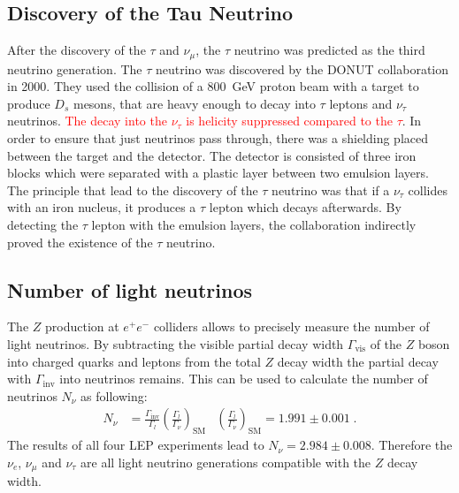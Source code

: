 \subsection{Discovery of the Tau Neutrino}
After the discovery of the $\tau$ and $\nu_{\mu}$, the $\tau$ neutrino was predicted as the third neutrino generation. The $\tau$ neutrino was discovered by the DONUT collaboration in 2000. They used the collision of a \SI{800}{\giga\electronvolt} proton beam with a target to produce $D_s$ mesons, that are heavy enough to decay into $\tau$ leptons and $\nu_{\tau}$ neutrinos. \textcolor{red}{The decay into the $\nu_{\tau}$ is helicity suppressed compared to the $\tau$}. In order to ensure that just neutrinos pass through, there was a shielding placed between the target and the detector.
The detector is consisted of three iron blocks which were separated with a plastic layer between two emulsion layers. The principle that lead to the discovery of the $\tau$ neutrino was that if a $\nu_{\tau}$ collides with an iron nucleus, it produces a $\tau$ lepton which decays afterwards. By detecting the $\tau$ lepton with the emulsion layers, the collaboration indirectly proved the existence of the $\tau$ neutrino.
\subsection{Number of light neutrinos}
The $Z$ production at $e^+e^-$ colliders allows to precisely measure the number of light neutrinos. By subtracting the visible partial decay width $\Gamma_{\text{vis}}$ of the $Z$ boson into charged quarks and leptons from the total $Z$ decay width the partial decay with $\Gamma_{\text{inv}}$ into neutrinos remains. This can be used to calculate the number of neutrinos $N_{\nu}$ as following:
\begin{align*}
	N_{\nu} &= \frac{\Gamma_{\text{inv}}}{\Gamma_{l}} \left( \frac{\Gamma_l}{\Gamma_{\nu}}\right)_{\text{SM}} & \left( \frac{\Gamma_l}{\Gamma_{\nu}}\right)_{\text{SM}} = 1.991 \pm 0.001 \; .
\end{align*}
The results of all four LEP experiments lead to $N_{\nu} = 2.984 \pm 0.008$. Therefore the $\nu_{e}$, $\nu_{\mu}$ and $\nu_{\tau}$ are all light neutrino generations compatible with the $Z$ decay width.
